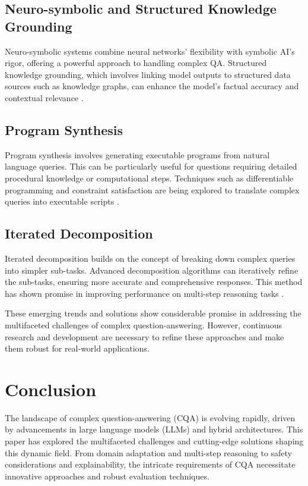 \documentclass[12pt]{article}
\begin{document}
\subsection{Neuro-symbolic and Structured Knowledge Grounding}
Neuro-symbolic systems combine neural networks' flexibility with symbolic AI's rigor, offering a powerful approach to handling complex QA. Structured knowledge grounding, which involves linking model outputs to structured data sources such as knowledge graphs, can enhance the model's factual accuracy and contextual relevance \cite{journalbesold}.

\subsection{Program Synthesis}
Program synthesis involves generating executable programs from natural language queries. This can be particularly useful for questions requiring detailed procedural knowledge or computational steps. Techniques such as differentiable programming and constraint satisfaction are being explored to translate complex queries into executable scripts \cite{journaldong2021}.

\subsection{Iterated Decomposition}
Iterated decomposition builds on the concept of breaking down complex queries into simpler sub-tasks. Advanced decomposition algorithms can iteratively refine the sub-tasks, ensuring more accurate and comprehensive responses. This method has shown promise in improving performance on multi-step reasoning tasks \cite{journalwang2022}.

These emerging trends and solutions show considerable promise in addressing the multifaceted challenges of complex question-answering. However, continuous research and development are necessary to refine these approaches and make them robust for real-world applications.

\section{Conclusion}
The landscape of complex question-answering (CQA) is evolving rapidly, driven by advancements in large language models (LLMs) and hybrid architectures. This paper has explored the multifaceted challenges and cutting-edge solutions shaping this dynamic field. From domain adaptation and multi-step reasoning to safety considerations and explainability, the intricate requirements of CQA necessitate innovative approaches and robust evaluation techniques.
\end{document}
